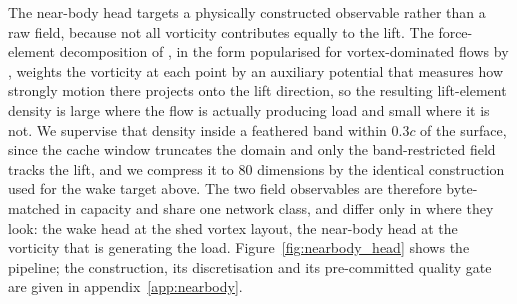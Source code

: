 
\label{sec:methods_chang}

The near-body head targets a physically constructed observable rather than a raw field, because not all vorticity contributes equally to the lift. The force-element decomposition of \citet{chang1992}, in the form popularised for vortex-dominated flows by \citet{menon2021}, weights the vorticity at each point by an auxiliary potential that measures how strongly motion there projects onto the lift direction, so the resulting lift-element density is large where the flow is actually producing load and small where it is not. We supervise that density inside a feathered band within $0.3c$ of the surface, since the cache window truncates the domain and only the band-restricted field tracks the lift, and we compress it to $80$ dimensions by the identical construction used for the wake target above. The two field observables are therefore byte-matched in capacity and share one network class, and differ only in where they look: the wake head at the shed vortex layout, the near-body head at the vorticity that is generating the load. Figure~\ref{fig:nearbody_head} shows the pipeline; the construction, its discretisation and its pre-committed quality gate are given in appendix~\ref{app:nearbody}.\re

